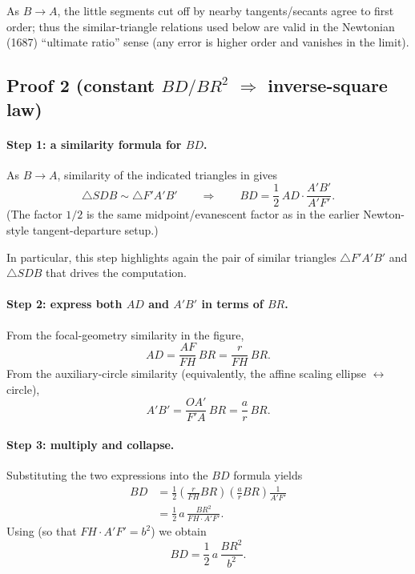 \begin{lemma}
  \label{lem:newton-small-distance}
  As $B\to A$, the little segments cut off by nearby tangents/secants agree to first order; thus the similar-triangle relations used below are valid in the Newtonian (1687) ``ultimate ratio'' sense (any error is higher order and vanishes in the limit).
\end{lemma}

\subsection{Proof 2 (constant \texorpdfstring{$BD/BR^2$}{BD over BR squared} \texorpdfstring{$\Rightarrow$}{=>} inverse-square law)}

\paragraph{Step 1: a similarity formula for $BD$.}
As $B\to A$, similarity of the indicated triangles in  gives
\begin{equation}
  \triangle SDB \sim \triangle F'\!A'B'
  \qquad\Longrightarrow\qquad
  BD=\frac12\,AD\cdot\frac{A'B'}{A'F'}.
\end{equation}
(The factor $1/2$ is the same midpoint/evanescent factor as in the earlier Newton-style tangent-departure setup.)

In particular, this step highlights again the pair of similar triangles $\triangle F'\!A'B'$ and $\triangle SDB$ that drives the computation.

\paragraph{Step 2: express both $AD$ and $A'B'$ in terms of $BR$.}
From the focal-geometry similarity in the figure,
\begin{equation}
  AD=\frac{AF}{FH}\,BR=\frac{r}{FH}\,BR.
\end{equation}
From the auxiliary-circle similarity (equivalently, the affine scaling ellipse $\leftrightarrow$ circle),
\begin{equation}
  A'B'=\frac{OA'}{F'\!A}\,BR=\frac{a}{r}\,BR.
\end{equation}

\paragraph{Step 3: multiply and collapse.}
Substituting the two expressions into the $BD$ formula yields
\begin{align}
  BD
  &=\frac12\left(\frac{r}{FH}BR\right)\left(\frac{a}{r}BR\right)\frac{1}{A'F'}\\
  &=\frac12\,a\,\frac{BR^2}{FH\cdot A'F'}.
\end{align}
Using  (so that $FH\cdot A'F'=b^2$) we obtain
\begin{equation}
  BD=\frac12\,a\,\frac{BR^2}{b^2}.
\end{equation}

